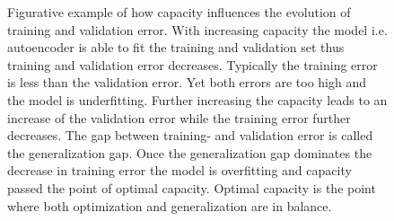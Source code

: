 \begin{figure}[htbp!]
	\centering
	
	\caption{\footnotesize Figurative example of how capacity influences the evolution of training and validation error. With increasing capacity the model i.e. autoencoder is able to fit the training and validation set thus training and validation error decreases. Typically the training error is less than the validation error. Yet both errors are too high and the model is underfitting. Further increasing the capacity leads to an increase of the validation error while the training error further decreases. The gap between training- and validation error is called the generalization gap. Once the generalization gap dominates the decrease in training error the model is overfitting and capacity passed the point of optimal capacity. Optimal capacity is the point where both optimization and generalization are in balance.}
	\label{Fig:Capacity}
\end{figure}\noindent
